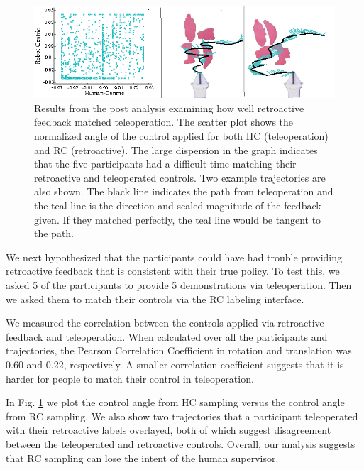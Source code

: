 \documentclass[10pt, conference]{ieeeconf}      %
\begin{document}
\begin{figure}
\centering
\includegraphics{f_figs/cor_data.eps}
\caption{
    \footnotesize
    Results from the post analysis examining how well retroactive feedback matched teleoperation. The scatter plot shows the normalized angle of the control applied for both HC (teleoperation) and RC (retroactive).  The large dispersion in the graph indicates that the five participants had a difficult time matching their retroactive and teleoperated controls. Two example trajectories are also shown.  The black line indicates the path from teleoperation and the teal line is the direction and scaled magnitude of the feedback given. If they matched perfectly, the teal line would be tangent to the path. 
}

\label{fig:izzy_traj}
\end{figure}


We next hypothesized that the participants could have had trouble providing retroactive feedback that is consistent with their true policy. To test this, we asked 5 of the participants to provide 5 demonstrations via teleoperation. Then we asked them to match their controls via the RC labeling interface. 

We measured the correlation between the controls applied via retroactive feedback and teleoperation. When calculated over all the participants and trajectories, the Pearson Correlation Coefficient in rotation and translation was 0.60 and 0.22, respectively. A smaller correlation coefficient suggests that it is harder for people to match their control in teleoperation. 

In Fig. \ref{fig:izzy_traj} we plot the control angle from HC sampling versus the control angle from RC sampling. We also show two trajectories that a participant teleoperated with their retroactive labels overlayed, both of which suggest disagreement between the teleoperated and retroactive controls. Overall, our analysis suggests that RC sampling can lose the intent of the human supervisor. 
\end{document}
